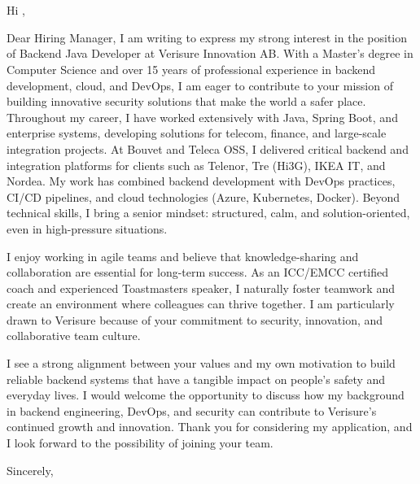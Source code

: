 \documentclass[a4paper,10pt]{letter}
\date{\today}
\begin{document}
\begin{letter}{ \\ \\ }

\opening{Hi ,}
Dear Hiring Manager,
I am writing to express my strong interest in the position of Backend Java Developer at Verisure Innovation AB. With a Master’s degree in Computer Science and over 15 years of professional experience in backend development, cloud, and DevOps, I am eager to contribute to your mission of building innovative security solutions that make the world a safer place.
Throughout my career, I have worked extensively with Java, Spring Boot, and enterprise systems, developing solutions for telecom, finance, and large-scale integration projects. At Bouvet and Teleca OSS, I delivered critical backend and integration platforms for clients such as Telenor, Tre (Hi3G), IKEA IT, and Nordea. My work has combined backend development with DevOps practices, CI/CD pipelines, and cloud technologies (Azure, Kubernetes, Docker).
Beyond technical skills, I bring a senior mindset: structured, calm, and solution-oriented, even in high-pressure situations. 

I enjoy working in agile teams and believe that knowledge-sharing and collaboration are essential for long-term success. 
As an ICC/EMCC certified coach and experienced Toastmasters speaker, I naturally foster teamwork and create an environment where 
colleagues can thrive together.
I am particularly drawn to Verisure because of your commitment to security, innovation, and collaborative team culture. 

I see a strong alignment between your values and my own motivation to build reliable backend systems that have a tangible 
impact on people’s safety and everyday lives.
I would welcome the opportunity to discuss how my background in backend engineering, DevOps, and security can contribute to Verisure’s 
continued growth and innovation. Thank you for considering my application, and I look forward to the possibility of joining your team.


\closing{Sincerely,}

\end{letter}
\end{document}
